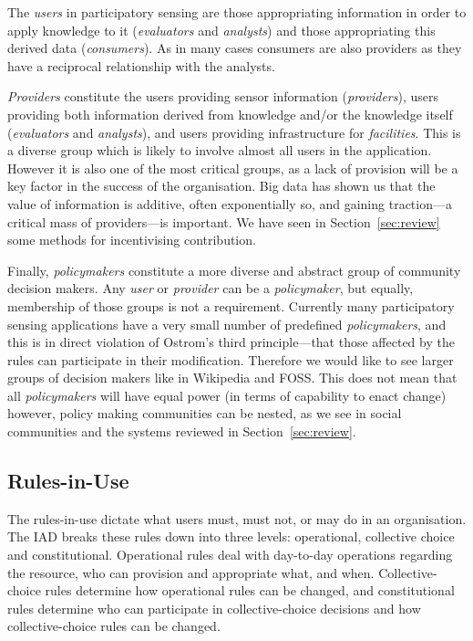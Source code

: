 The \emph{users} in participatory sensing are those appropriating information in order to apply knowledge to it (\emph{evaluators} and \emph{analysts}) and those appropriating this derived data (\emph{consumers}). As in many cases consumers are also providers as they have a reciprocal relationship with the analysts.

\emph{Providers} constitute the users providing sensor information (\emph{providers}), users providing both information derived from knowledge and/or the knowledge itself (\emph{evaluators} and \emph{analysts}), and users providing infrastructure for \emph{facilities}. This is a diverse group which is likely to involve almost all users in the application. However it is also one of the most critical groups, as a lack of provision will be a key factor in the success of the organisation. Big data has shown us that the value of information is additive, often exponentially so, and gaining traction---a critical mass of providers---is important. 
We have seen in Section~\ref{sec:review} some methods for incentivising contribution.

Finally, \emph{policymakers} constitute a more diverse and abstract group of community decision makers. Any \emph{user} or \emph{provider} can be a \emph{policymaker}, but equally, membership of those groups is not a requirement. 
Currently many participatory sensing applications have a very small number of predefined \emph{policymakers}, and this is in direct violation of Ostrom's third principle---that those affected by the rules can participate in their modification. 
Therefore we would like to see larger groups of decision makers like in Wikipedia and FOSS. This does not mean that all \emph{policymakers} will have equal power (in terms of capability to enact change) however, policy making communities can be nested, as we see in social communities and the systems reviewed in Section~\ref{sec:review}.


\subsection{Rules-in-Use}

The rules-in-use dictate what users must, must not, or may do in an organisation. The \ac{IAD} breaks these rules down into three levels: operational, collective choice and constitutional. Operational rules deal with day-to-day operations regarding the resource, who can provision and appropriate what, and when. 
Collective-choice rules determine how operational rules can be changed, and constitutional rules determine who can participate in collective-choice decisions and how collective-choice rules can be changed.

